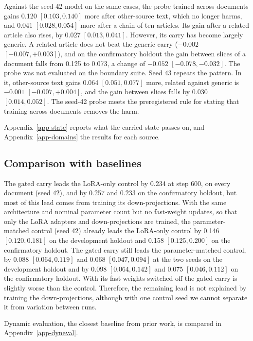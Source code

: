 \documentclass[10pt]{article} %
\begin{document}
Against the seed-42 model on the same cases, the probe trained across documents gains 0.120 $[0.103, 0.140]$ more after other-source text, which no longer harms, and 0.041 $[0.028, 0.054]$ more after a chain of ten articles. Its gain after a related article also rises, by 0.027 $[0.013, 0.041]$. However, its carry has become largely generic. A related article does not beat the generic carry ($-0.002$ $[-0.007, +0.003]$), and on the confirmatory holdout the gain between slices of a document falls from 0.125 to 0.073, a change of $-0.052$ $[-0.078, -0.032]$. The probe was not evaluated on the boundary suite. Seed 43 repeats the pattern. In it, other-source text gains 0.064 $[0.051, 0.077]$ more, related against generic is $-0.001$ $[-0.007, +0.004]$, and the gain between slices falls by 0.030 $[0.014, 0.052]$. The seed-42 probe meets the preregistered rule for stating that training across documents removes the harm.

Appendix~\ref{app-state} reports what the carried state passes on, and Appendix~\ref{app-domains} the results for each source.

\subsection{Comparison with baselines}
\label{sec-compare}

The gated carry leads the LoRA-only control by 0.234 at step 600, on every document (seed 42), and by 0.257 and 0.233 on the confirmatory holdout, but most of this lead comes from training its down-projections. With the same architecture and nominal parameter count but no fast-weight updates, so that only the LoRA adapters and down-projections are trained, the parameter-matched control (seed 42) already leads the LoRA-only control by 0.146 $[0.120, 0.181]$ on the development holdout and 0.158 $[0.125, 0.200]$ on the confirmatory holdout. The gated carry still leads the parameter-matched control, by 0.088 $[0.064, 0.119]$ and 0.068 $[0.047, 0.094]$ at the two seeds on the development holdout and by 0.098 $[0.064, 0.142]$ and 0.075 $[0.046, 0.112]$ on the confirmatory holdout. With its fast weights switched off the gated carry is slightly worse than the control. Therefore, the remaining lead is not explained by training the down-projections, although with one control seed we cannot separate it from variation between runs.

Dynamic evaluation, the closest baseline from prior work, is compared in Appendix~\ref{app-dyneval}.
\end{document}
